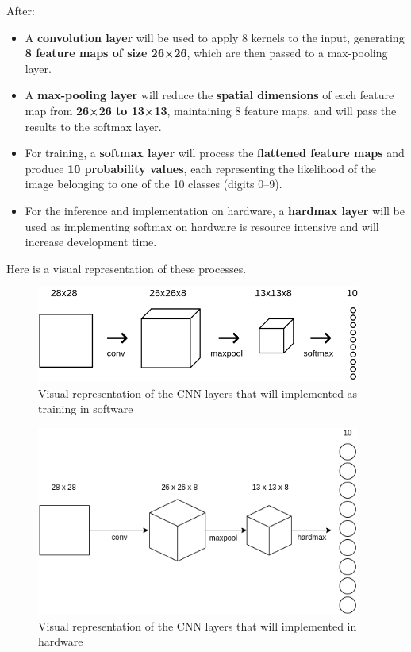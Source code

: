 \documentclass{article}
\begin{document}
After:
\begin{itemize}
  \item A \textbf{convolution layer} will be used to apply 8 kernels to the input, generating \textbf{8 feature maps of size 26×26}, which are then passed to a max-pooling layer.
  \item A \textbf{max-pooling layer} will reduce the \textbf{spatial dimensions} of each feature map from \textbf{26×26 to 13×13}, maintaining 8 feature maps, and will pass the results to the softmax layer.
  \item For training, a \textbf{softmax layer} will process the \textbf{flattened feature maps} and produce \textbf{10 probability values}, each representing the likelihood of the image belonging to one of the 10 classes (digits 0–9).
  \item For the inference and implementation on hardware, a \textbf{hardmax layer} will be used as implementing softmax on hardware is resource intensive and will increase development time.
\end{itemize}

Here is a visual representation of these processes.
\begin{figure}[H]
  \begin{center}
    \includegraphics[width=0.95\textwidth]{figures/arch_vis_training}
  \end{center}
  \caption{Visual representation of the CNN layers that will implemented as training in software}\label{fig:cnn_arch}
\end{figure}
\begin{figure}[H]
  \begin{center}
    \includegraphics[width=0.95\textwidth]{figures/arch_vis}
  \end{center}
  \caption{Visual representation of the CNN layers that will implemented in hardware}\label{fig:cnn_arch}
\end{figure}
\newpage 
\end{document}
